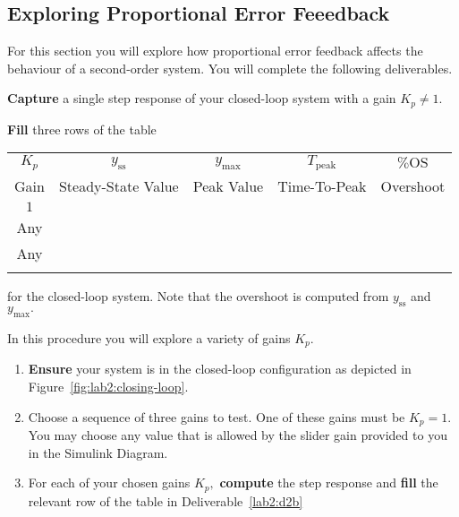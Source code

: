 \subsection{Exploring Proportional Error Feeedback}
For this section you will explore how proportional error feedback affects
the behaviour of a second-order system. You will complete the following
deliverables.
%
\begin{deliverable}[label={lab2:d2}]
  \textbf{Capture} a single step response of your closed-loop system
  with a gain \(K_p \neq 1.\)
\end{deliverable}
%
\begin{deliverable}[label={lab2:d2b}]
  \textbf{Fill} three rows of the table
  \begin{center}
  \begin{tabular}{c|c|c|c|c}
    \(K_p\)
      & \(y_\mathrm{ss}\)
      & \(y_\mathrm{max}\)
      & \(T_\mathrm{peak}\)
      & \(\%\mathrm{OS}\) \\
    Gain
      & Steady-State Value
      & Peak Value
      & Time-To-Peak
      & Overshoot \\ \hline
    \(1\) & & & & \\ \hline
    Any & & & & \\ \hline
    Any & & & & \\ \hline
    & & & &
  \end{tabular}
  \end{center}
  for the closed-loop system.
  Note that the overshoot is computed from \(y_\mathrm{ss}\) and
  \(y_\mathrm{max}.\)
\end{deliverable}

%
\begin{procedure}[label={proc:lab2:p2}]
  In this procedure you will explore a variety of gains \(K_p.\)
  \begin{enumerate}[label=(\arabic*)]
    \item{
      \textbf{Ensure} your system is in the closed-loop configuration
      as depicted in Figure~\ref{fig:lab2:closing-loop}.
    }
    \item{
      Choose a sequence of three gains to test. One of these gains
      must be \(K_p = 1.\) You may choose any value that is allowed by
      the slider gain provided to you in the Simulink Diagram.
    }
    \item{
      For each of your chosen gains \(K_p,\) \textbf{compute} the step
      response and \textbf{fill} the relevant row of the table
      in Deliverable~\ref{lab2:d2b}
    }
  \end{enumerate}
\end{procedure}

